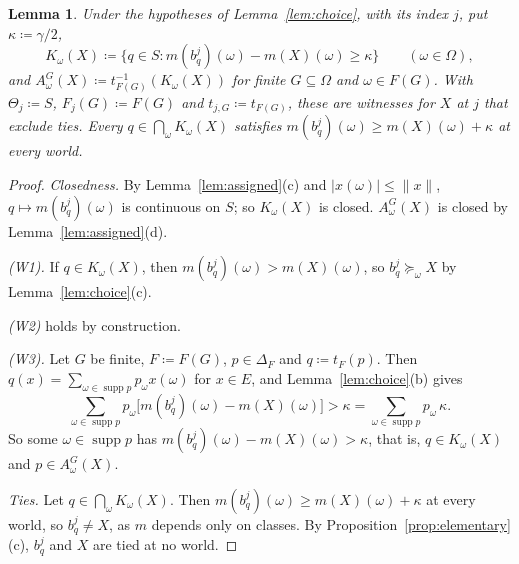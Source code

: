 \documentclass[11pt]{article}
\newtheorem{lemma}[theorem]{Lemma}
\theoremstyle{definition}
\DeclareMathOperator{\supp}{supp}
\begin{document}
\begin{lemma}\label{lem:witnesses}
Under the hypotheses of Lemma~\ref{lem:choice}, with its index $j$, put $\kappa\coloneqq\gamma/2$,
\[
K_\omega(X)\coloneqq\bigl\{q\in S:m(b^j_q)(\omega)-m(X)(\omega)\ge \kappa\bigr\}\qquad(\omega\in\Omega),
\]
and $A^G_\omega(X)\coloneqq t_{F(G)}^{-1}(K_\omega(X))$ for finite $G\subseteq\Omega$ and $\omega\in F(G)$. With $\Theta_j\coloneqq S$, $F_j(G)\coloneqq F(G)$ and $t_{j,G}\coloneqq t_{F(G)}$, these are witnesses for $X$ at $j$ that exclude ties. Every $q\in\bigcap_\omega K_\omega(X)$ satisfies $m(b^j_q)(\omega)\ge m(X)(\omega)+\kappa$ at every world.
\end{lemma}
\begin{proof}
\emph{Closedness.} By Lemma~\ref{lem:assigned}(c) and $|x(\omega)|\le\|x\|$, $q\mapsto m(b^j_q)(\omega)$ is continuous on $S$; so $K_\omega(X)$ is closed. $A^G_\omega(X)$ is closed by Lemma~\ref{lem:assigned}(d).

\emph{(W1).} If $q\in K_\omega(X)$, then $m(b^j_q)(\omega)>m(X)(\omega)$, so $b^j_q\succeq_\omega X$ by Lemma~\ref{lem:choice}(c).

\emph{(W2)} holds by construction.

\emph{(W3).} Let $G$ be finite, $F\coloneqq F(G)$, $p\in\Delta_F$ and $q\coloneqq t_F(p)$. Then $q(x)=\sum_{\omega\in\supp p}p_\omega x(\omega)$ for $x\in E$, and Lemma~\ref{lem:choice}(b) gives
\[
\sum_{\omega\in\supp p}p_\omega\bigl[m(b^j_q)(\omega)-m(X)(\omega)\bigr]>\kappa=\sum_{\omega\in\supp p}p_\omega\,\kappa .
\]
So some $\omega\in\supp p$ has $m(b^j_q)(\omega)-m(X)(\omega)>\kappa$, that is, $q\in K_\omega(X)$ and $p\in A^G_\omega(X)$.

\emph{Ties.} Let $q\in\bigcap_\omega K_\omega(X)$. Then $m(b^j_q)(\omega)\ge m(X)(\omega)+\kappa$ at every world, so $b^j_q\ne X$, as $m$ depends only on classes. By Proposition~\ref{prop:elementary}(c), $b^j_q$ and $X$ are tied at no world.
\end{proof}
\end{document}
